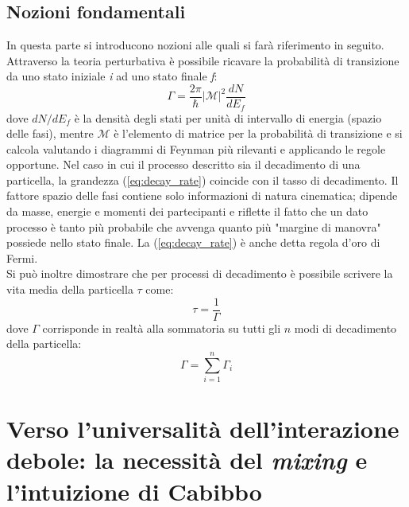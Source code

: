 \documentclass{subnucbo}
\begin{document}
\subsection{Nozioni fondamentali}
In questa parte si introducono nozioni alle quali si farà riferimento in seguito.\\
Attraverso la teoria perturbativa è possibile ricavare la probabilità di transizione da uno stato iniziale \textit{i} ad uno stato finale \textit{f}:
\begin{equation}
        \Gamma = \frac{2 \pi} {\hbar} | \mathcal{M}|^{2} \frac{dN}{dE_{f}}
        \label{eq:decay_rate}
\end{equation}
dove $dN/dE_{f}$ è la densità degli stati per unità di intervallo di energia (spazio delle fasi), mentre $\mathcal{M}$ è l'elemento di matrice per la probabilità di transizione e si calcola valutando i diagrammi di Feynman più rilevanti e applicando le regole opportune. Nel caso in cui il processo descritto sia il decadimento di una particella, la grandezza (\ref{eq:decay_rate}) coincide con il tasso di decadimento. Il fattore spazio delle fasi contiene solo informazioni di natura cinematica; dipende da masse, energie e momenti dei partecipanti e riflette il fatto che un dato processo è tanto più probabile che avvenga quanto più "margine di manovra" possiede nello stato finale. La (\ref{eq:decay_rate}) è anche detta regola d'oro di Fermi. \\
Si può inoltre dimostrare \cite{ref:griff} che per processi di decadimento è possibile scrivere la vita media della particella $\tau$ come:
\begin{equation}
        \tau = \frac{1}{\Gamma}
        \label{eq:tau}
\end{equation}
dove $\Gamma$ corrisponde in realtà alla sommatoria su tutti gli $n$ modi di decadimento della particella:
\begin{equation}
        \Gamma = \sum _ { i = 1 } ^ { n } \Gamma _ { i }
        \label{eq:gamma_sum}
\end{equation}

\section{Verso l'universalità dell'interazione debole: la necessità del \textit{mixing} e l'intuizione di Cabibbo}
\label{sec:part_one}
\end{document}
